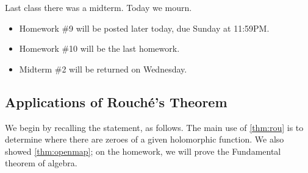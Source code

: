 
Last class there was a midterm. Today we mourn.
\begin{itemize}
	\item Homework \#9 will be posted later today, due Sunday at 11:59PM.
	\item Homework \#10 will be the last homework.
	\item Midterm \#2 will be returned on Wednesday.
\end{itemize}

\subsection{Applications of Rouch\'e's Theorem}
We begin by recalling the statement, as follows.
\routhm*
\noindent The main use of \autoref{thm:rou} is to determine where there are zeroes of a given holomorphic function. We also showed \autoref{thm:openmap}; on the homework, we will prove the Fundamental theorem of algebra.

